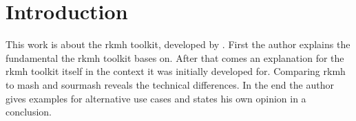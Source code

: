 \section{Introduction}

This work is about the rkmh toolkit, developed by \citeauthor{rkmh} \cite{rkmh}. First the author explains the fundamental the rkmh toolkit bases on. After that comes an explanation for the rkmh toolkit itself in the context it was initially developed for. Comparing rkmh to mash \cite{mash} and sourmash \cite{sourmash} reveals the technical differences. In the end the author gives examples for alternative use cases and states his own opinion in a conclusion.